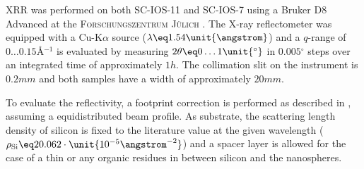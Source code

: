 \documentclass[\main/dresen_thesis.tex]{subfiles}
\begin{document}
    XRR was performed on both SC-IOS-11 and SC-IOS-7 using a Bruker D8 Advanced at the \textsc{Forschungszentrum J\"ulich} .
    The X-ray reflectometer was equipped with a Cu-K$\alpha$ source ($\lambda \eq 1.54 \unit{\angstrom}$) and a $q$-range of $0 \ldots 0.15 \unit{\angstrom^{-1}}$ is evaluated by measuring $2 \theta \eq 0 \ldots 1 \unit{^\circ}$ in $0.005 \unit{^\circ}$ steps over an integrated time of approximately $1 \unit{h}$.
    The collimation slit on the instrument is $0.2 \unit{mm}$ and both samples have a width of approximately $20 \unit{mm}$.

    To evaluate the reflectivity, a footprint correction is performed as described in , assuming a equidistributed beam profile.
    As substrate, the scattering length density of silicon is fixed to the literature value at the given wavelength ($\rho_\mathrm{Si} \eq 20.062 \cdot \unit{10^{-5} \angstrom^{-2}}$) and a spacer layer is allowed for the case of a thin  or any organic residues in between silicon and the nanospheres.
\end{document}
